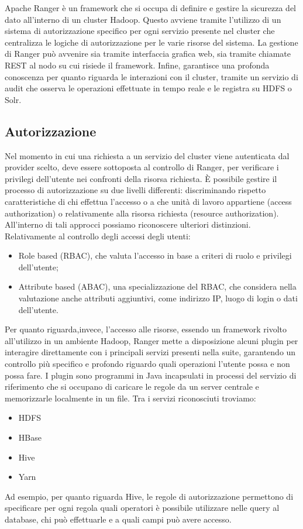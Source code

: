 Apache Ranger \cite{ranger_doc} è un framework che si occupa di definire e gestire la sicurezza del dato all'interno di un cluster Hadoop. Questo avviene tramite l'utilizzo di un sistema di autorizzazione specifico per ogni servizio presente nel cluster che centralizza le logiche di autorizzazione per le varie risorse del sistema. La gestione di Ranger può avvenire sia tramite interfaccia grafica web, sia tramite chiamate REST al nodo su cui risiede il framework. Infine, garantisce una profonda conoscenza per quanto riguarda le interazioni con il cluster, tramite un servizio di audit che osserva le operazioni effettuate in tempo reale e le registra su HDFS o Solr.
\newline

\subsection{Autorizzazione}

Nel momento in cui una richiesta a un servizio del cluster viene autenticata dal provider scelto, deve essere sottoposta al controllo di Ranger, per verificare i privilegi dell'utente nei confronti della risorsa richiesta. È possibile gestire il processo di autorizzazione su due livelli differenti: discriminando rispetto caratteristiche di chi effettua l'accesso o a che unità di lavoro appartiene (access authorization) o relativamente alla risorsa richiesta (resource authorization).
\newline 
All'interno di tali approcci possiamo riconoscere ulteriori distinzioni. Relativamente al controllo degli accessi degli utenti:
\begin{itemize}
	\item Role based (RBAC), che valuta l'accesso in base a criteri di ruolo e privilegi dell'utente;
	\item Attribute based (ABAC), una specializzazione del RBAC, che considera nella valutazione anche attributi aggiuntivi, come indirizzo IP, luogo di login o dati dell'utente.
\end{itemize}
Per quanto riguarda,invece, l'accesso alle risorse, essendo un framework rivolto all'utilizzo in un ambiente Hadoop, Ranger mette a disposizione alcuni plugin per interagire direttamente con i principali servizi presenti nella suite, garantendo un controllo più specifico e profondo riguardo quali operazioni l'utente possa e non possa fare. I plugin sono programmi in Java incapsulati in processi del servizio di riferimento che si occupano di caricare le regole da un server centrale e memorizzarle localmente in un file. Tra i servizi riconosciuti troviamo:
\begin{itemize}
	\item HDFS
	\item HBase
	\item Hive
	\item Yarn
\end{itemize}
Ad esempio, per quanto riguarda Hive, le regole di autorizzazione permettono di specificare per ogni regola quali operatori è possibile utilizzare nelle query al database, chi può effettuarle e a quali campi può avere accesso.
\newline

